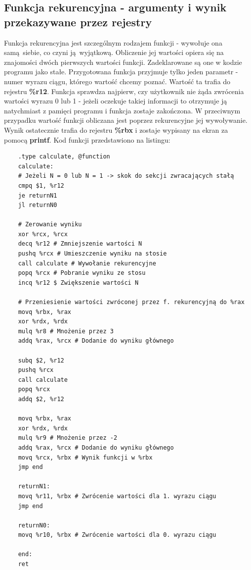 \documentclass[a4paper,12pt]{article}
\begin{document}
\subsection{Funkcja rekurencyjna - argumenty i wynik przekazywane przez rejestry}
Funkcja rekurencyjna jest szczególnym rodzajem funkcji - wywołuje ona samą siebie, co czyni ją wyjątkową. Obliczenie jej wartości opiera się na znajomości dwóch pierwszych wartości funkcji. Zadeklarowane są one w kodzie programu jako stałe. Przygotowana funkcja przyjmuje tylko jeden parametr - numer wyrazu ciągu, którego wartość chcemy poznać. Wartość ta trafia do rejestru \textbf{\%r12}. Funkcja sprawdza najpierw, czy użytkownik nie żąda zwrócenia wartości wyrazu 0 lub 1 - jeżeli oczekuje takiej informacji to otrzymuje ją natychmiast z pamięci programu i funkcja zostaje zakończona. W przeciwnym przypadku wartość funkcji obliczana jest poprzez rekurencyjne jej wywoływanie. Wynik ostatecznie trafia do rejestru \textbf{\%rbx} i zostaje wypisany na ekran za pomocą \textbf{printf}. Kod funkcji przedstawiono na listingu:
\begin{verbatim}
	.type calculate, @function
	calculate:
	# Jeżeli N = 0 lub N = 1 -> skok do sekcji zwracających stałą
	cmpq $1, %r12
	je returnN1
	jl returnN0
	
	# Zerowanie wyniku
	xor %rcx, %rcx
	decq %r12 # Zmniejszenie wartości N
	pushq %rcx # Umieszczenie wyniku na stosie
	call calculate # Wywołanie rekurencyjne
	popq %rcx # Pobranie wyniku ze stosu
	incq %r12 $ Zwiększenie wartości N
	
	# Przeniesienie wartości zwróconej przez f. rekurencyjną do %rax
	movq %rbx, %rax 
	xor %rdx, %rdx
	mulq %r8 # Mnożenie przez 3
	addq %rax, %rcx # Dodanie do wyniku głównego
	
	subq $2, %r12
	pushq %rcx
	call calculate
	popq %rcx
	addq $2, %r12
	
	movq %rbx, %rax
	xor %rdx, %rdx
	mulq %r9 # Mnożenie przez -2
	addq %rax, %rcx # Dodanie do wyniku głównego
	movq %rcx, %rbx # Wynik funkcji w %rbx
	jmp end
	
	returnN1:
	movq %r11, %rbx # Zwrócenie wartości dla 1. wyrazu ciągu
	jmp end
	
	returnN0:
	movq %r10, %rbx # Zwrócenie wartości dla 0. wyrazu ciągu
	
	end:
	ret
\end{verbatim}
\end{document}
